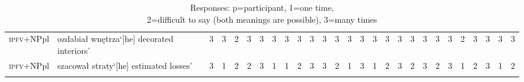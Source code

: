 \documentclass[output=paper]{langscibook}
\begin{document}
\begin{sidewaystable}
{\begin{tabular}{l>{\raggedright}p{5cm}rrrrrrrrrrrrrrrrrrrrrrrrr}
\textsc{ipfv}+NPpl&ozdabiał wnętrza\newline  `[he] decorated interiors'&3&3&2&3&3&3&3&3&3&3&3&3&3&3&3&3&3&3&3&3&2&3&3&3&3\\
\textsc{ipfv}+NPpl&szacował straty\newline  `[he] estimated losses'&3&1&2&2&3&1&1&2&3&3&2&1&3&1&2&3&2&3&2&3&1&2&3&1&2\\
\lspbottomrule
    \end{tabular}
    }
    \caption{Responses: p=participant, 1=one time,\\ 2=difficult to say (both meanings are possible), 3=many times}
    \label{jan-bla:fansb:kb:tab4}
\end{sidewaystable}

{\sloppy\printbibliography[heading=subbibliography,notkeyword=this]}
\end{document}

